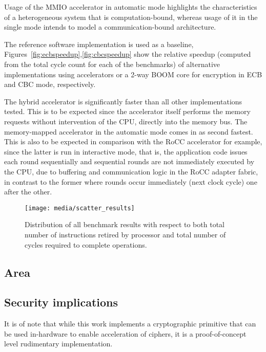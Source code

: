 \documentclass[10pt,conference]{IEEEtran}
\begin{document}
Usage of the MMIO accelerator in automatic mode highlights the characteristics
of a heterogeneous system that is computation-bound, whereas usage of it in the
single mode intends to model a communication-bound architecture.

The reference software implementation is used as a baseline,
Figures~\ref{fig:ecbspeedup},\ref{fig:cbcspeedup} show the relative speedup
(computed from the total cycle count for each of the benchmarks) of alternative
implementations using accelerators or a 2-way BOOM core for encryption in ECB
and CBC mode, respectively.

The hybrid accelerator is significantly faster than all other implementations
tested. This is to be expected since the accelerator itself performs the memory
requests without intervention of the CPU, directly into the memory bus. The
memory-mapped accelerator in the automatic mode comes in as second fastest. This
is also to be expected in comparison with the RoCC accelerator for example,
since the latter is run in interactive mode, that is, the application code
issues each round sequentially and sequential rounds are not immediately
executed by the CPU, due to buffering and communication logic in the RoCC
adapter fabric, in contrast to the former where rounds occur immediately (next
clock cycle) one after the other.



\begin{figure}
  \centering
  \texttt{[image: media/scatter\_results]}
  \caption{Distribution of all benchmark results with respect to both total
    number of instructions retired by processor and total number of cycles
    required to complete operations.}
  \label{fig:scatter}
\end{figure}

\subsection{Area}

\subsection{Security implications}

It is of note that while this work implements a cryptographic primitive that can
be used in-hardware to enable acceleration of ciphers, it is a proof-of-concept
level rudimentary implementation.
\end{document}
